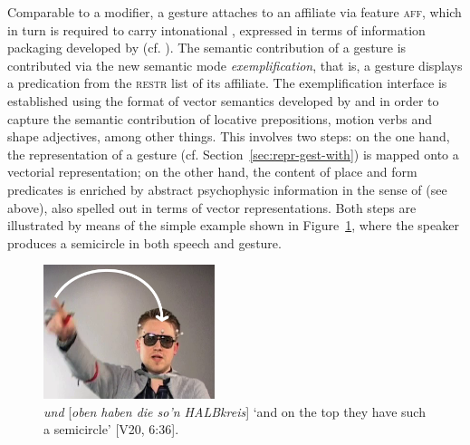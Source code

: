 \documentclass[output=paper,biblatex,babelshorthands,newtxmath,draftmode,colorlinks,citecolor=brown]{langscibook}
\begin{document}
\ea \label{ex:sg-ensemble}
\z

\noindent 
Comparable to a modifier, a gesture attaches to an affiliate via feature \textsc{aff}, 
which in turn is required to carry intonational , expressed in terms of information
packaging developed by \cite{Engdahl:Vallduvi:1996}
(cf. ). The semantic contribution of a gesture is
contributed via the new semantic mode  \textit{exemplification}, that is, a gesture
displays a predication from the \textsc{restr} list of its affiliate. The exemplification interface
is established using the format of vector semantics developed by \citet{Zwarts:Winter:2000} and
\citet{Zwarts:2003} in order to capture the semantic contribution of locative prepositions, motion
verbs and shape adjectives, among other things. This involves two steps: on the one hand, the
representation of a gesture (cf. Section~\ref{sec:repr-gest-with}) is mapped onto a vectorial
representation; on the other hand, the content of place and form predicates is enriched by abstract
psychophysic information in the sense of \citet{Johansson:1973} (see above), also spelled out in
terms of vector representations. Both steps are illustrated by means of the simple example shown in
Figure~\ref{fig:halbkreis}, where the speaker produces a semicircle in both speech and gesture. 

\begin{figure}
  \centering
  \includegraphics[width=5cm]{figures/Halbkreis-path}
  \caption[]{\textit{und} [\textit{oben haben die so'n HALBkreis}] \enquote*{and on the top they have such a semicircle} [V20, 6:36].}
  \label{fig:halbkreis}
\end{figure}
\end{document}
